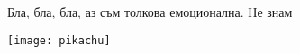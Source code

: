 \documentclass[main.tex]{subfiles}
\begin{document}
Бла, бла, бла, аз съм толкова емоционална. 
Не знам

\texttt{[image: pikachu]}
\end{document}
